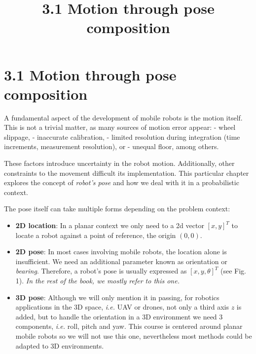 \documentclass[11pt]{article}
\title{3.1 Motion through pose composition}
\providecommand{\tightlist}{%
      \setlength{\itemsep}{0pt}\setlength{\parskip}{0pt}}
\begin{document}
    
    \maketitle
    
    

    
    \hypertarget{motion-through-pose-composition}{%
\section{3.1 Motion through pose
composition}\label{motion-through-pose-composition}}

A fundamental aspect of the development of mobile robots is the motion
itself. This is not a trivial matter, as many sources of motion error
appear: - wheel slippage, - inaccurate calibration, - limited resolution
during integration (time increments, measurement resolution), or -
unequal floor, among others.

These factors introduce uncertainty in the robot motion. Additionally,
other constraints to the movement difficult its implementation. This
particular chapter explores the concept of \emph{robot's pose} and how
we deal with it in a probabilistic context.

The pose itself can take multiple forms depending on the problem
context:

\begin{itemize}
\tightlist
\item
  \textbf{2D location}: In a planar context we only need to a 2d vector
  \([x, y]^T\) to locate a robot against a point of reference, the
  origin \((0, 0).\)
\item
  \textbf{2D pose}: In most cases involving mobile robots, the location
  alone is insufficient. We need an additional parameter known as
  orientation or \emph{bearing}. Therefore, a robot's pose is usually
  expressed as \([x, y, \theta]^T\) (see Fig. 1). \emph{In the rest of
  the book, we mostly refer to this one.}
\item
  \textbf{3D pose}: Although we will only mention it in passing, for
  robotics applications in the 3D space, \emph{i.e.} UAV or drones, not
  only a third axis \(z\) is added, but to handle the orientation in a
  3D environment we need 3 components, \emph{i.e.} roll, pitch and yaw.
  This course is centered around planar mobile robots so we will not use
  this one, nevertheless most methods could be adapted to 3D
  environments.
\end{itemize}
\end{document}

